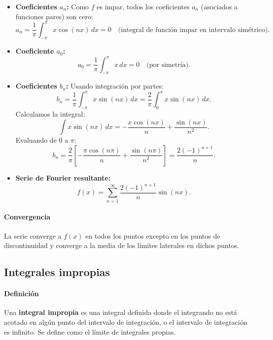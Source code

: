 \documentclass[12pt, a4paper]{article}
\theoremstyle{rioplatense}
\begin{document}
\begin{itemize}
    \item \textbf{Coeficientes \( a_n \):}
    Como \( f \) es impar, todos los coeficientes \( a_n \) (asociados a funciones pares) son cero:
    \[
    a_n = \frac{1}{\pi} \int_{-\pi}^\pi x \cos(nx) \, dx = 0 \quad \text{(integral de función impar en intervalo simétrico)}.
    \]

    \item \textbf{Coeficiente \( a_0 \):}
    \[
    a_0 = \frac{1}{\pi} \int_{-\pi}^\pi x \, dx = 0 \quad \text{(por simetría)}.
    \]

    \item \textbf{Coeficientes \( b_n \):}
    Usando integración por partes:
    \[
    b_n = \frac{1}{\pi} \int_{-\pi}^\pi x \sin(nx) \, dx = \frac{2}{\pi} \int_0^\pi x \sin(nx) \, dx.
    \]
    Calculamos la integral:
    \[
    \int x \sin(nx) \, dx = -\frac{x \cos(nx)}{n} + \frac{\sin(nx)}{n^2}.
    \]
    Evaluando de \( 0 \) a \( \pi \):
    \[
    b_n = \frac{2}{\pi} \left[ -\frac{\pi \cos(n\pi)}{n} + \frac{\sin(n\pi)}{n^2} \right] = \frac{2(-1)^{n+1}}{n}.
    \]

    \item \textbf{Serie de Fourier resultante:}
    \[
    f(x) = \sum_{n=1}^\infty \frac{2(-1)^{n+1}}{n} \sin(nx).
    \]
\end{itemize}

\paragraph{Convergencia}
La serie converge a \( f(x) \) en todos los puntos excepto en los puntos de discontinuidad %
y converge a la media de los límites laterales en dichos puntos.

\subsection{Integrales impropias} %


\paragraph{Definición}
Una \textbf{integral impropia} es una integral definida donde el integrando no está acotado en algún punto del intervalo de integración, o el intervalo de integración es infinito. Se define como el límite de integrales propias.
\end{document}
